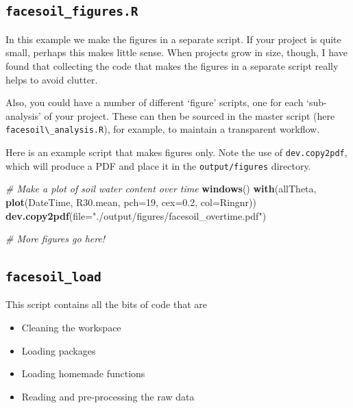 \documentclass[]{book}
\newenvironment{Shaded}{\begin{snugshade}}{\end{snugshade}}
\newcommand{\CommentTok}[1]{\textcolor[rgb]{0.56,0.35,0.01}{\textit{#1}}}
\newcommand{\DataTypeTok}[1]{\textcolor[rgb]{0.13,0.29,0.53}{#1}}
\newcommand{\DecValTok}[1]{\textcolor[rgb]{0.00,0.00,0.81}{#1}}
\newcommand{\FloatTok}[1]{\textcolor[rgb]{0.00,0.00,0.81}{#1}}
\newcommand{\KeywordTok}[1]{\textcolor[rgb]{0.13,0.29,0.53}{\textbf{#1}}}
\newcommand{\NormalTok}[1]{#1}
\newcommand{\StringTok}[1]{\textcolor[rgb]{0.31,0.60,0.02}{#1}}
\providecommand{\tightlist}{%
  \setlength{\itemsep}{0pt}\setlength{\parskip}{0pt}}
\begin{document}
\hypertarget{facesoil_figures.r}{%
\subsection{\texorpdfstring{\texttt{facesoil\_figures.R}}{facesoil\_figures.R}}\label{facesoil_figures.r}}

In this example we make the figures in a separate script. If your project is quite small, perhaps this makes little sense. When projects grow in size, though, I have found that collecting the code that makes the figures in a separate script really helps to avoid clutter.

Also, you could have a number of different `figure' scripts, one for each `sub-analysis' of your project. These can then be sourced in the master script (here \texttt{facesoil\textbackslash{}\_analysis.R}), for example, to maintain a transparent workflow.

Here is an example script that makes figures only. Note the use of \texttt{dev.copy2pdf}, which will produce a PDF and place it in the \texttt{output/figures} directory.

\begin{Shaded}
\begin{Highlighting}[]
\CommentTok{# Make a plot of soil water content over time}
\KeywordTok{windows}\NormalTok{()}
\KeywordTok{with}\NormalTok{(allTheta, }\KeywordTok{plot}\NormalTok{(DateTime, R30.mean, }\DataTypeTok{pch=}\DecValTok{19}\NormalTok{, }\DataTypeTok{cex=}\FloatTok{0.2}\NormalTok{,}
                    \DataTypeTok{col=}\NormalTok{Ringnr))}
\KeywordTok{dev.copy2pdf}\NormalTok{(}\DataTypeTok{file=}\StringTok{"./output/figures/facesoil_overtime.pdf"}\NormalTok{)}

\CommentTok{# More figures go here!}
\end{Highlighting}
\end{Shaded}

\hypertarget{facesoil_load}{%
\subsection{\texorpdfstring{\texttt{facesoil\_load}}{facesoil\_load}}\label{facesoil_load}}

This script contains all the bits of code that are

\begin{itemize}
\tightlist
\item
  Cleaning the workspace
\item
  Loading packages
\item
  Loading homemade functions
\item
  Reading and pre-processing the raw data
\end{itemize}
\end{document}
